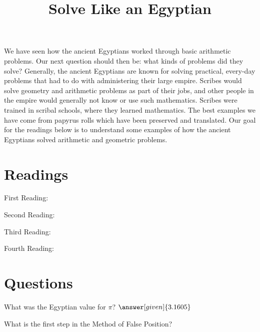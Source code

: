 \documentclass{ximera}
\title{Solve Like an Egyptian}
\begin{document}
\begin{abstract}
\end{abstract}
\maketitle



We have seen how the ancient Egyptians worked through basic arithmetic problems.  Our next question should then be: what kinds of problems did they solve?  Generally, the ancient Egyptians are known for solving practical, every-day problems that had to do with administering their large empire.  Scribes would solve geometry and arithmetic problems as part of their jobs, and other people in the empire would generally not know or use such mathematics.  Scribes were trained in scribal schools, where they learned mathematics.  The best examples we have come from papyrus rolls which have been preserved and translated.  Our goal for the readings below is to understand some examples of how the ancient Egyptians solved arithmetic and geometric problems.



\section{Readings}

First Reading: 

Second Reading: 

Third Reading: 

Fourth Reading: 


\section{Questions}

\begin{question}
What was the Egyptian value for $\pi$? $\answer[given]{3.1605}$
\end{question}

\begin{question}
What is the first step in the Method of False Position?
\begin{multipleChoice}
\end{multipleChoice}
\end{question}


\end{document}
